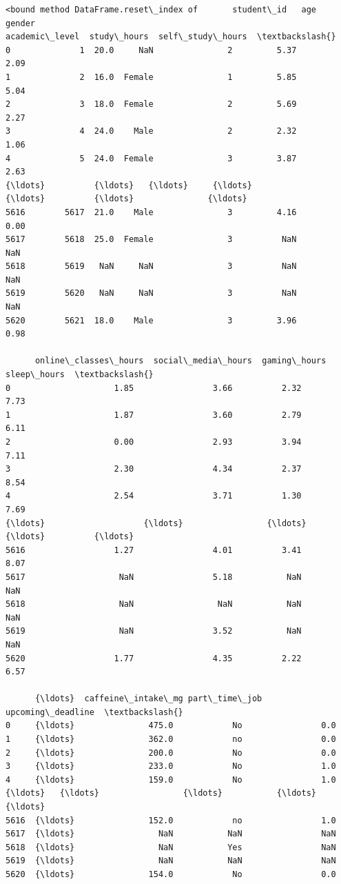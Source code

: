 \documentclass[11pt]{article}
\makeatletter
\newcommand{\boxspacing}{\kern\kvtcb@left@rule\kern\kvtcb@boxsep}
\newcommand{\prompt}[4]{
        {\ttfamily\llap{{\color{#2}[#3]:\hspace{3pt}#4}}\vspace{-\baselineskip}}
    }
\makeatother
\begin{document}
            \begin{tcolorbox}[breakable, size=fbox, boxrule=.5pt, pad at break*=1mm, opacityfill=0]
\prompt{Out}{outcolor}{10}{\boxspacing}
\begin{Verbatim}[commandchars=\\\{\}]
<bound method DataFrame.reset\_index of       student\_id   age  gender
academic\_level  study\_hours  self\_study\_hours  \textbackslash{}
0              1  20.0     NaN               2         5.37              2.09
1              2  16.0  Female               1         5.85              5.04
2              3  18.0  Female               2         5.69              2.27
3              4  24.0    Male               2         2.32              1.06
4              5  24.0  Female               3         3.87              2.63
{\ldots}          {\ldots}   {\ldots}     {\ldots}             {\ldots}          {\ldots}               {\ldots}
5616        5617  21.0    Male               3         4.16              0.00
5617        5618  25.0  Female               3          NaN               NaN
5618        5619   NaN     NaN               3          NaN               NaN
5619        5620   NaN     NaN               3          NaN               NaN
5620        5621  18.0    Male               3         3.96              0.98

      online\_classes\_hours  social\_media\_hours  gaming\_hours  sleep\_hours  \textbackslash{}
0                     1.85                3.66          2.32         7.73
1                     1.87                3.60          2.79         6.11
2                     0.00                2.93          3.94         7.11
3                     2.30                4.34          2.37         8.54
4                     2.54                3.71          1.30         7.69
{\ldots}                    {\ldots}                 {\ldots}           {\ldots}          {\ldots}
5616                  1.27                4.01          3.41         8.07
5617                   NaN                5.18           NaN          NaN
5618                   NaN                 NaN           NaN          NaN
5619                   NaN                3.52           NaN          NaN
5620                  1.77                4.35          2.22         6.57

      {\ldots}  caffeine\_intake\_mg part\_time\_job  upcoming\_deadline  \textbackslash{}
0     {\ldots}               475.0            No                0.0
1     {\ldots}               362.0            no                0.0
2     {\ldots}               200.0            No                0.0
3     {\ldots}               233.0            No                1.0
4     {\ldots}               159.0            No                1.0
{\ldots}   {\ldots}                 {\ldots}           {\ldots}                {\ldots}
5616  {\ldots}               152.0            no                1.0
5617  {\ldots}                 NaN           NaN                NaN
5618  {\ldots}                 NaN           Yes                NaN
5619  {\ldots}                 NaN           NaN                NaN
5620  {\ldots}               154.0            No                0.0


\end{Verbatim}
\end{tcolorbox}
\end{document}
